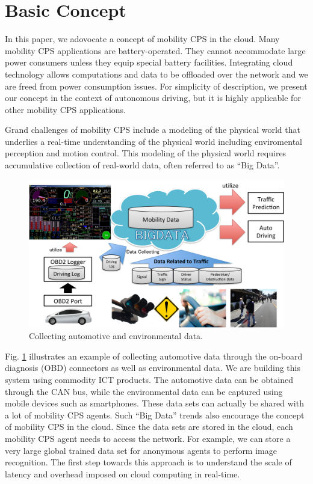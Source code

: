 \section{Basic Concept}
\label{sec:concept}

In this paper, we adovocate a concept of mobility CPS in the cloud.
Many mobility CPS applications are battery-operated.
They cannot accommodate large power consumers unless they equip special
battery facilities.
Integrating cloud technology allows computations and data to be
offloaded over the network and we are freed from power consumption
issues.
For simplicity of description, we present our concept in the context of
autonomous driving, but it is highly applicable for other mobility CPS
applications.

Grand challenges of mobility CPS include a modeling of the physical
world that underlies a real-time understanding of the physical world
including enviromental perception and motion control.
This modeling of the physical world requires accumulative collection of
real-world data, often referred to as ``Big Data''.

\begin{figure}[!t]
 \centering
 \includegraphics[width=\hsize]{fig/OBD2.pdf}
 \caption{Collecting automotive and environmental data.}
 \label{fig:obd2}
\end{figure}

Fig. \ref{fig:obd2} illustrates an example of collecting automotive data
through the on-board diagnosis (OBD) connectors as well as environmental
data.
We are building this system using commodity ICT products. 
The automotive data can be obtained through the CAN bus, while the
environmental data can be captured using mobile devices such as
smartphones.
These data sets can actually be shared with a lot of mobility CPS
agents.
Such ``Big Data'' trends also encourage the concept of mobility CPS in
the cloud.
Since the data sets are stored in the cloud, each mobility CPS agent
needs to access the network.
For example, we can store a very large global trained data set
\cite{Niknejad12} for anonymous agents to perform image recognition.
The first step towards this approach is to understand the scale of
latency and overhead imposed on cloud computing in real-time.


